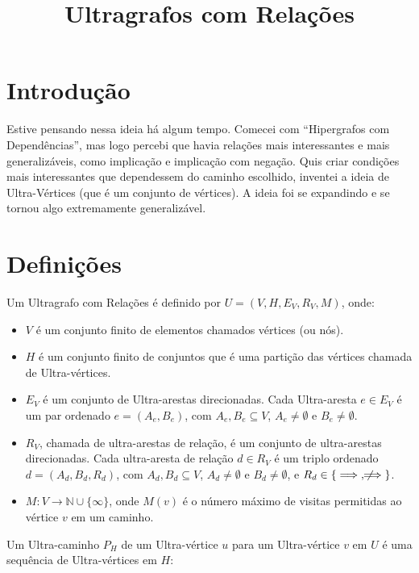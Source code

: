 \documentclass{article}
\title{Ultragrafos com Relações}
\author{} %
\begin{document}
\maketitle

\section{Introdução}

Estive pensando nessa ideia há algum tempo. Comecei com ``Hipergrafos com Dependências'', mas logo percebi que havia relações mais interessantes e mais generalizáveis, como implicação e implicação com negação. Quis criar condições mais interessantes que dependessem do caminho escolhido, inventei a ideia de Ultra-Vértices (que é um conjunto de vértices). A ideia foi se expandindo e se tornou algo extremamente generalizável.

\section{Definições}

Um Ultragrafo com Relações é definido por \( U = (V, H, E_V, R_V, M) \), onde:

\begin{itemize}
    \item \( V \) é um conjunto finito de elementos chamados vértices (ou nós).
    \item \( H \) é um conjunto finito de conjuntos que é uma partição das vértices chamada de Ultra-vértices.
    \item \( E_V \) é um conjunto de Ultra-arestas direcionadas. Cada Ultra-aresta \( e \in E_V \) é um par ordenado \( e = (A_e, B_e) \), com \( A_e, B_e \subseteq V \), \( A_e \neq \emptyset \) e \( B_e \neq \emptyset \).
    \item \( R_V \), chamada de ultra-arestas de relação, é um conjunto de ultra-arestas direcionadas. Cada ultra-aresta de relação \( d \in R_V \) é um triplo ordenado \( d = (A_d, B_d, R_d) \), com \( A_d, B_d \subseteq V \), \( A_d \neq \emptyset \) e \( B_d \neq \emptyset \), e \( R_d \in \{\implies, \not\!\!\!\implies\} \).
    \item \( M: V \to \mathbb{N} \cup \{\infty\} \), onde \( M(v) \) é o número máximo de visitas permitidas ao vértice \( v \) em um caminho.
\end{itemize}

Um Ultra-caminho \( P_H \) de um Ultra-vértice \( u \) para um Ultra-vértice \( v \) em \( U \) é uma sequência de Ultra-vértices em \( H \):
\end{document}
